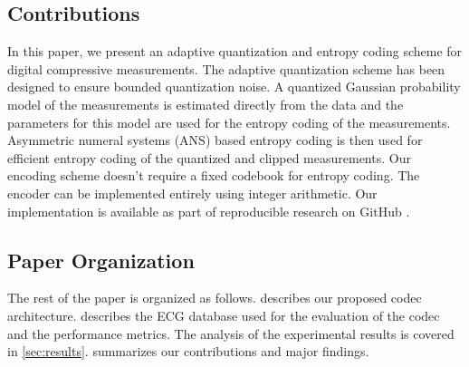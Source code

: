 \subsection{Contributions}
In this paper, we present an adaptive quantization and
entropy coding scheme for digital compressive measurements.
The adaptive quantization scheme has been designed
to ensure bounded quantization noise.
A quantized Gaussian probability model of the measurements
is estimated directly from the data
and the parameters for this model are used
for the entropy coding of the measurements.  
Asymmetric numeral systems (ANS) based
entropy coding is then used for efficient entropy coding
of the quantized and clipped measurements.
Our encoding scheme doesn't require a fixed codebook
for entropy coding.
The encoder can be implemented entirely using integer arithmetic.
Our implementation is available as part of
reproducible research on GitHub \cite{kumar2022ecgcodec}.

\subsection{Paper Organization}
The rest of the paper is organized as follows.
 describes our proposed codec architecture.
 describes the ECG database
used for the evaluation of the codec and the
performance metrics.
The analysis of the experimental results is covered in \cref{sec:results}.
 summarizes our contributions and major findings.

